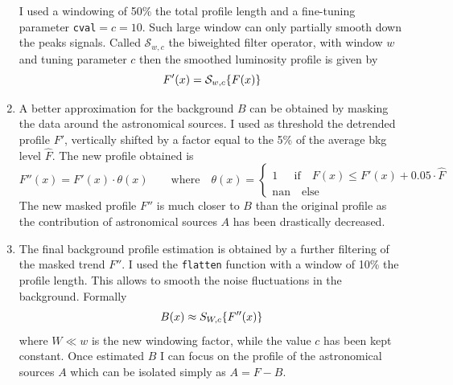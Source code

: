 \begin{enumerate}
	I used a windowing of 50\% the total profile length and a fine-tuning parameter \texttt{cval}$=c=10$. Such large window can only partially smooth down the peaks signals. Called $\mathcal{S}_{w,c}$ the biweighted filter operator, with window $w$ and tuning parameter $c$ then the smoothed luminosity profile is given by
	\begin{equation}
		F'(x)= \mathcal{S}_{w,c}\large\{ F(x) \large\}
	\end{equation}
	\item A better approximation for the background $B$ can be obtained by masking the data around the astronomical sources. I
	used as threshold the detrended profile $F'$, vertically shifted by a factor equal to the 5\% of the average
	bkg level $\hat F$. The new profile obtained is
	\begin{equation}
		F''(x) = F'(x)\cdot\theta(x)\qquad\text{where}\quad\theta(x)=\begin{cases}
		1\ \ \quad \text{if}\quad F(x) \leq F'(x)+0.05\cdot\hat{F}\\
		\text{nan}\quad\text{else}
		\end{cases}
	\end{equation}
	The new masked profile $F''$ is much closer to $B$ than the original profile as the contribution of astronomical sources $A$ has been drastically decreased.
	\item The final background profile estimation is obtained by a further filtering of the masked trend $F''$. I used the \texttt{flatten} function with a window of 10\% the profile length. This allows to smooth the noise fluctuations in the background. Formally
	\begin{equation}
		B(x)\approx S_{W,c} \large\{ F''(x) \large\}
	\end{equation}
	where $W\ll w$ is the new windowing factor, while the value $c$ has been kept constant. Once estimated $B$ I can focus on the profile of the astronomical sources $A$ which can be isolated simply as $A=F-B$.
	

\end{enumerate}
